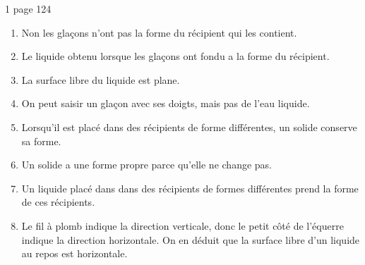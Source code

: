 \begin{myact}{1 page 124}
	\begin{enumerate}
		\item Non les glaçons n'ont pas la forme du récipient qui les contient.\pause
		\item Le liquide obtenu lorsque les glaçons ont fondu a la forme du récipient.\pause
		\item La surface libre du liquide est plane.\pause
		\item On peut saisir un glaçon avec ses doigts, mais pas de l'eau liquide.\pause
		\item Lorsqu'il est placé dans des récipients de forme différentes, un solide conserve sa forme.\pause
		\item Un solide a une forme propre parce qu'elle ne change pas.\pause
		\item Un liquide placé dans dans des récipients de formes différentes prend la forme de ces récipients.\pause
		\item Le fil à plomb indique la direction verticale, donc le petit côté de l'équerre indique la direction horizontale. On en déduit que la surface libre d'un liquide au repos est horizontale.
	\end{enumerate}
\end{myact}